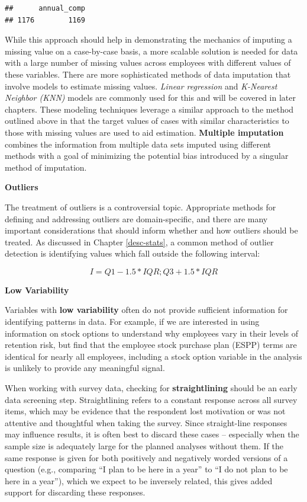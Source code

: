 \documentclass[]{book}
\begin{document}
\begin{verbatim}
##      annual_comp
## 1176        1169
\end{verbatim}

While this approach should help in demonstrating the mechanics of imputing a missing value on a case-by-case basis, a more scalable solution is needed for data with a large number of missing values across employees with different values of these variables. There are more sophisticated methods of data imputation that involve models to estimate missing values. \emph{Linear regression} and \emph{K-Nearest Neighbor (KNN)} models are commonly used for this and will be covered in later chapters. These modeling techniques leverage a similar approach to the method outlined above in that the target values of cases with similar characteristics to those with missing values are used to aid estimation. \textbf{Multiple imputation} combines the information from multiple data sets imputed using different methods with a goal of minimizing the potential bias introduced by a singular method of imputation.

\textbf{Outliers}

The treatment of outliers is a controversial topic. Appropriate methods for defining and addressing outliers are domain-specific, and there are many important considerations that should inform whether and how outliers should be treated. As discussed in Chapter \ref{desc-stats}, a common method of outlier detection is identifying values which fall outside the following interval:

\[I = Q1 - 1.5 * IQR; Q3 + 1.5 * IQR\]

\textbf{Low Variability}

Variables with \textbf{low variability} often do not provide sufficient information for identifying patterns in data. For example, if we are interested in using information on stock options to understand why employees vary in their levels of retention risk, but find that the employee stock purchase plan (ESPP) terms are identical for nearly all employees, including a stock option variable in the analysis is unlikely to provide any meaningful signal.

When working with survey data, checking for \textbf{straightlining} should be an early data screening step. Straightlining refers to a constant response across all survey items, which may be evidence that the respondent lost motivation or was not attentive and thoughtful when taking the survey. Since straight-line responses may influence results, it is often best to discard these cases -- especially when the sample size is adequately large for the planned analyses without them. If the same response is given for both positively and negatively worded versions of a question (e.g., comparing ``I plan to be here in a year'' to ``I do not plan to be here in a year''), which we expect to be inversely related, this gives added support for discarding these responses.
\end{document}
